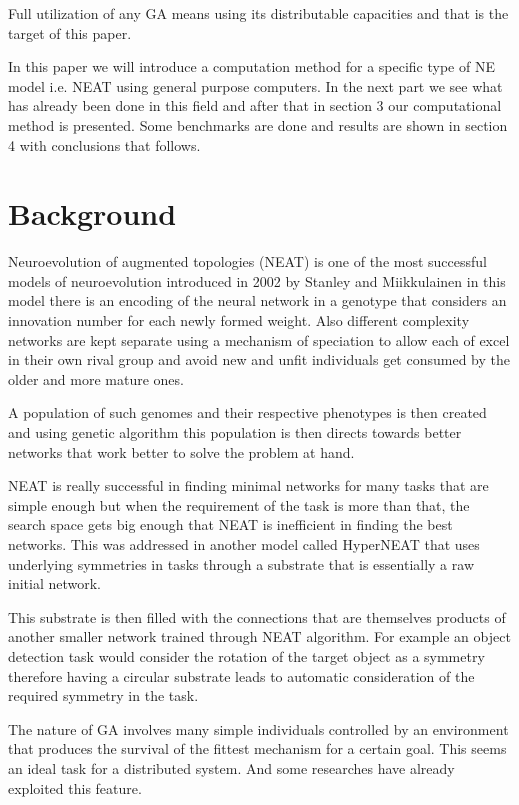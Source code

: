 \documentclass[twocolumn]{article}
\begin{document}
Full utilization of any GA means using its distributable capacities and that is the target of this paper.

In this paper we will introduce a computation method for a specific type of NE model i.e. NEAT using general purpose computers. In the next part we see what has already been done in this field and after that in section 3 our computational method is presented. Some benchmarks are done and results are shown in section 4 with conclusions that follows.


\section{Background}
Neuroevolution of augmented topologies (NEAT) is one of the most successful models of neuroevolution introduced in 2002 by Stanley and Miikkulainen \cite{originalNEAT} in this model there is an encoding of the neural network in a genotype that considers an innovation number for each newly formed weight. Also different complexity networks are kept separate using a mechanism of speciation to allow each of excel in their own rival group and avoid new and unfit individuals get consumed by the older and more mature ones.

A population of such genomes and their respective phenotypes is then created and using genetic algorithm this population is then directs towards better networks that work better to solve the problem at hand.

NEAT is really successful in finding minimal networks for many tasks that are simple enough but when the requirement of the task is more than that, the search space gets big enough that NEAT is inefficient in finding the best networks. This was addressed in  another model called HyperNEAT \cite{originalHyperNEAT} that uses underlying symmetries in tasks through a substrate that is essentially a raw initial network.

This substrate is then filled with the connections that are themselves products of another smaller network trained through NEAT algorithm. For example an object detection task would consider the rotation of the target object as a symmetry therefore having a circular substrate leads to automatic consideration of the required symmetry in the task.

The nature of GA involves many simple individuals controlled by an environment that produces the survival of the fittest mechanism for a certain goal. This seems an ideal task for a distributed system. And some researches have already exploited this feature.
\end{document}
